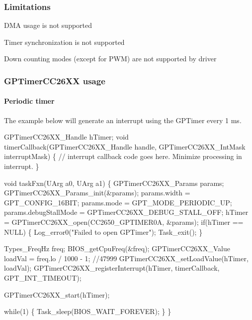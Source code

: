 \subsubsection*{Limitations}


\begin{DoxyItemize}
\item D\+M\+A usage is not supported
\item Timer synchronization is not supported
\item Down counting modes (except for P\+W\+M) are not supported by driver
\end{DoxyItemize}

\subsubsection*{G\+P\+Timer\+C\+C26\+X\+X usage}

\paragraph*{Periodic timer}

The example below will generate an interrupt using the G\+P\+Timer every 1 ms.


\begin{DoxyCode}
GPTimerCC26XX_Handle hTimer;
\textcolor{keywordtype}{void} timerCallback(GPTimerCC26XX_Handle handle, GPTimerCC26XX_IntMask interruptMask) \{
    \textcolor{comment}{// interrupt callback code goes here. Minimize processing in interrupt.}
\}

\textcolor{keywordtype}{void} taskFxn(UArg a0, UArg a1) \{
  GPTimerCC26XX_Params params;
  GPTimerCC26XX_Params_init(&params);
  params.width          = GPT_CONFIG_16BIT;
  params.mode           = GPT_MODE_PERIODIC_UP;
  params.debugStallMode = GPTimerCC26XX_DEBUG_STALL_OFF;
  hTimer = GPTimerCC26XX_open(CC2650\_GPTIMER0A, &params);
  \textcolor{keywordflow}{if}(hTimer == NULL) \{
    Log\_error0(\textcolor{stringliteral}{"Failed to open GPTimer"});
    Task\_exit();
  \}

  Types\_FreqHz  freq;
  BIOS\_getCpuFreq(&freq);
  GPTimerCC26XX_Value loadVal = freq.lo / 1000 - 1; \textcolor{comment}{//47999}
  GPTimerCC26XX_setLoadValue(hTimer, loadVal);
  GPTimerCC26XX_registerInterrupt(hTimer, timerCallback, GPT_INT_TIMEOUT);

  GPTimerCC26XX_start(hTimer);

  \textcolor{keywordflow}{while}(1) \{
    Task\_sleep(BIOS\_WAIT\_FOREVER);
  \}
\}
\end{DoxyCode}


